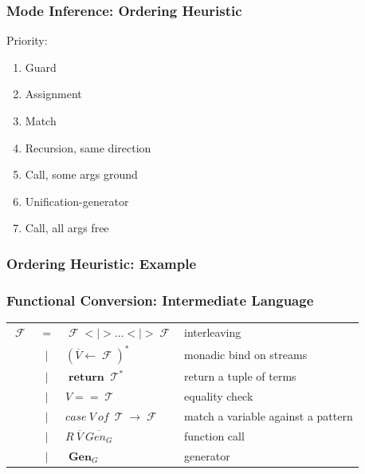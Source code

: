 \documentclass[xcolor=table, aspectratio=169]{beamer}
\DeclareMathOperator{\Term}{\mathcal{T}}
\DeclareMathOperator{\Fun}{\mathcal{F}}
\DeclareMathOperator{\Rtrn}{\mathbf{return}}
\DeclareMathOperator{\Gen}{\mathbf{Gen}}
\newcommand{\LIST}[1]{ #1^*}
\begin{document}
\begin{frame}[fragile]
  \frametitle{Mode Inference: Ordering Heuristic}
\begin{center}
Priority:
\end{center}

\vfill

\begin{center}
  \begin{minipage}{0.4\textwidth}
    \begin{enumerate}
      \item Guard
      \item Assignment
      \item Match
      \item Recursion, same direction
      \item Call, some args ground
      \item Unification-generator
      \item Call, all args free
    \end{enumerate}
  \end{minipage}
\end{center}


\end{frame}

\begin{frame}[fragile]
  \frametitle{Ordering Heuristic: Example}

\end{frame}

\begin{frame}[fragile]
  \frametitle{Functional Conversion: Intermediate Language}
\begin{center}
\begin{tabular}{lcll}
    $\Fun$ & $=$ & $\Fun <|> \dots <|> \Fun$ & interleaving\\
               & $\mid$ & $\LIST{\left(\overline{V} \leftarrow \Fun\right)} $ & monadic bind on streams\\
               & $\mid$ & $\Rtrn \LIST{\Term}$ & return a tuple of terms\\
               & $\mid$ & $V == \Term$ & equality check\\
               & $\mid$ &  $case \ V \ of \ \Term \rightarrow \Fun$& match a variable against a pattern\\
               & $\mid$ & $R \ \overline{V} \ \overline{Gen_{G}}$ & function call\\
               & $\mid$ & $\Gen_{G}$ & generator
\end{tabular}
\end{center}
\end{frame}
\end{document}
